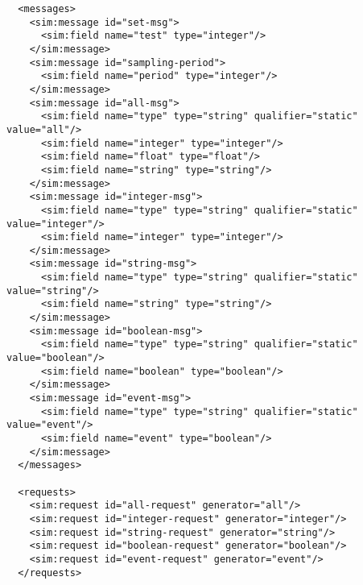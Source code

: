 \begin{lstlisting}
  <messages>
    <sim:message id="set-msg">
      <sim:field name="test" type="integer"/>
    </sim:message>
    <sim:message id="sampling-period">
      <sim:field name="period" type="integer"/>
    </sim:message>
    <sim:message id="all-msg">
      <sim:field name="type" type="string" qualifier="static" value="all"/>
      <sim:field name="integer" type="integer"/>
      <sim:field name="float" type="float"/>
      <sim:field name="string" type="string"/>
    </sim:message>
    <sim:message id="integer-msg">
      <sim:field name="type" type="string" qualifier="static" value="integer"/>
      <sim:field name="integer" type="integer"/>
    </sim:message>
    <sim:message id="string-msg">
      <sim:field name="type" type="string" qualifier="static" value="string"/>
      <sim:field name="string" type="string"/>
    </sim:message>
    <sim:message id="boolean-msg">
      <sim:field name="type" type="string" qualifier="static" value="boolean"/>
      <sim:field name="boolean" type="boolean"/>
    </sim:message>
    <sim:message id="event-msg">
      <sim:field name="type" type="string" qualifier="static" value="event"/>
      <sim:field name="event" type="boolean"/>
    </sim:message>
  </messages>

  <requests>
    <sim:request id="all-request" generator="all"/>
    <sim:request id="integer-request" generator="integer"/>
    <sim:request id="string-request" generator="string"/>
    <sim:request id="boolean-request" generator="boolean"/>
    <sim:request id="event-request" generator="event"/>
  </requests>


\end{lstlisting}
